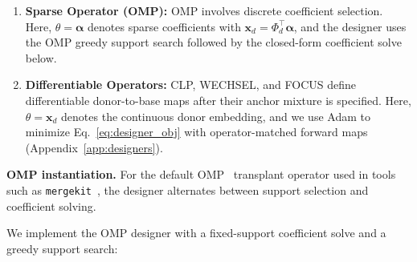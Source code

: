 \begin{enumerate}[leftmargin=*,topsep=0pt,itemsep=0pt,parsep=0pt,partopsep=0pt]
    \item \textbf{Sparse Operator (OMP):} OMP involves discrete coefficient selection. Here, $\theta = \boldsymbol{\alpha}$ denotes sparse coefficients with $\mathbf{x}_d = \Phi_d^\top \boldsymbol{\alpha}$, and the designer uses the OMP greedy support search followed by the closed-form coefficient solve below.
    \item \textbf{Differentiable Operators:} CLP, WECHSEL, and FOCUS define differentiable donor-to-base maps after their anchor mixture is specified. Here, $\theta = \mathbf{x}_d$ denotes the continuous donor embedding, and we use Adam to minimize Eq.~\ref{eq:designer_obj} with operator-matched forward maps (Appendix~\ref{app:designers}).
\end{enumerate}
\noindent\textbf{OMP instantiation.}
For the default OMP~\citep{pati1993orthogonal,goddard2025tftransplant} transplant operator used in tools such as \texttt{mergekit}~\citep{mergekit2024}, the designer alternates between support selection and coefficient solving.


We implement the OMP designer with a fixed-support coefficient solve and a greedy support search:


